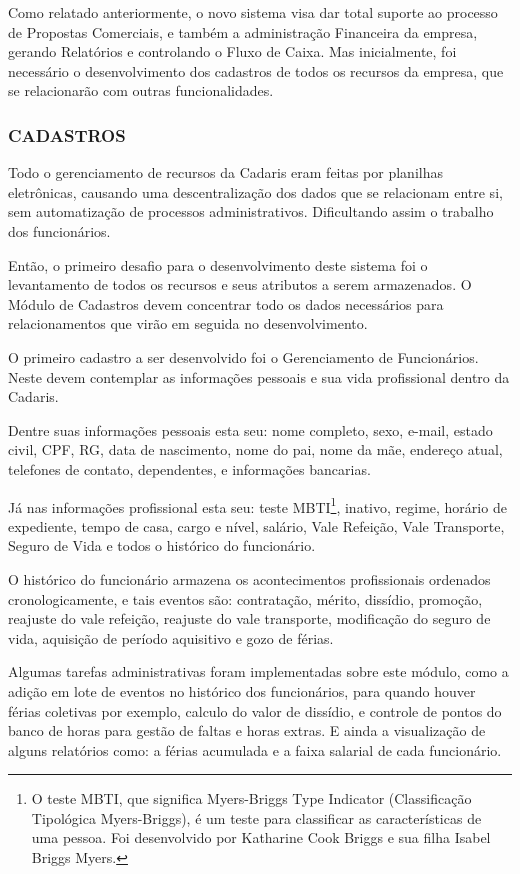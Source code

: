 \documentclass[
  12pt,				%
  openany,
  oneside,
  a4paper,			%
  english,			%
  brazil
]{article}
\numberwithin{figure}{section}
\numberwithin{table}{section}
\begin{document}
Como relatado anteriormente, o novo sistema visa dar total suporte ao processo de Propostas Comerciais, e também a administração Financeira da empresa, gerando Relatórios e controlando o Fluxo de Caixa. Mas inicialmente, foi necessário o desenvolvimento dos cadastros de todos os recursos da empresa, que se relacionarão com outras funcionalidades.


\subsubsection{CADASTROS}
Todo o gerenciamento de recursos da Cadaris eram feitas por planilhas eletrônicas, causando uma descentralização dos dados que se relacionam entre si, sem automatização de processos administrativos. Dificultando assim o trabalho dos funcionários.

Então, o primeiro desafio para o desenvolvimento deste sistema foi o levantamento de todos os recursos e seus atributos a serem armazenados. O Módulo de Cadastros devem concentrar todo os dados necessários para relacionamentos que virão em seguida no desenvolvimento.

O primeiro cadastro a ser desenvolvido foi o Gerenciamento de Funcionários. Neste devem contemplar as informações pessoais e sua vida profissional dentro da Cadaris. 

Dentre suas informações pessoais esta seu: nome completo, sexo, e-mail, estado civil, CPF, RG, data de nascimento, nome do pai, nome da mãe, endereço atual, telefones de contato, dependentes, e informações bancarias.

Já nas informações profissional esta seu: teste MBTI\footnote{O teste MBTI, que significa Myers-Briggs Type Indicator (Classificação Tipológica Myers-Briggs), é um teste para classificar as características de uma pessoa. Foi desenvolvido por Katharine Cook Briggs e sua filha Isabel Briggs Myers.}, inativo, regime, horário de expediente, tempo de casa, cargo e nível, salário, Vale Refeição, Vale Transporte, Seguro de Vida e todos o histórico do funcionário.

O histórico do funcionário armazena os acontecimentos profissionais ordenados cronologicamente, e tais eventos são: contratação, mérito, dissídio, promoção, reajuste do vale refeição, reajuste do vale transporte, modificação do seguro de vida, aquisição de período aquisitivo e gozo de férias.

Algumas tarefas administrativas foram implementadas sobre este módulo, como a adição em lote de eventos no histórico dos funcionários, para quando houver férias coletivas por exemplo, calculo do valor de dissídio, e controle de pontos do banco de horas para gestão de faltas e horas extras. E ainda a visualização de alguns relatórios como: a férias acumulada e a faixa salarial de cada funcionário.
\end{document}

